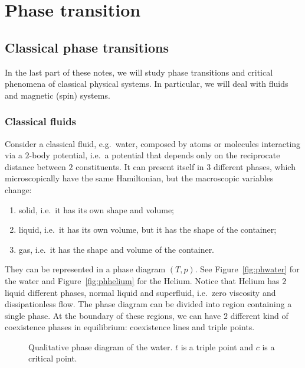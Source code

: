 \part{Phase transition}

\chapter{Classical phase transitions}

    In the last part of these notes, we will study phase transitions and critical phenomena of classical physical systems. In particular, we will deal with fluids and magnetic (spin) systems.

\section{Classical fluids}

    Consider a classical fluid, e.g.~water, composed by atoms or molecules interacting via a $2$-body potential, i.e.~a potential that depends only on the reciprocate distance between $2$ constituents. It can present itself in $3$ different phases, which microscopically have the same Hamiltonian, but the macroscopic variables change:
    \begin{enumerate}
        \item solid, i.e.~it has its own shape and volume;
        \item liquid, i.e.~it has its own volume, but it has the shape of the container;
        \item gas, i.e.~it has the shape and volume of the container. 
    \end{enumerate}
    They can be represented in a phase diagram $(T,p)$. See Figure~\eqref{fig:phwater} for the water and Figure~\eqref{fig:phhelium} for the Helium. Notice that Helium has $2$ liquid different phases, normal liquid and superfluid, i.e.~zero viscosity and dissipationless flow. The phase diagram can be divided into region containing a single phase. At the boundary of these regions, we can have $2$ different kind of coexistence phases in equilibrium: coexistence lines and triple points.  

    \begin{figure}[h!]
        \centering
        \caption{Qualitative phase diagram of the water. $t$ is a triple point and $c$ is a critical point.}
        \label{fig:phwater}
    \end{figure}

